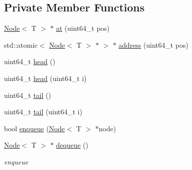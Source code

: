 \subsection*{Private Member Functions}
\begin{DoxyCompactItemize}
\item 
\hyperlink{classtervel_1_1containers_1_1lf_1_1mcas__buffer_1_1_node}{Node}$<$ T $>$ $\ast$ \hyperlink{classtervel_1_1containers_1_1lf_1_1mcas__buffer_1_1_ring_buffer_a5e063402e583e35b1a752fa9f0bc77ae}{at} (uint64\+\_\+t pos)
\item 
std\+::atomic$<$ \hyperlink{classtervel_1_1containers_1_1lf_1_1mcas__buffer_1_1_node}{Node}$<$ T $>$ $\ast$ $>$ $\ast$ \hyperlink{classtervel_1_1containers_1_1lf_1_1mcas__buffer_1_1_ring_buffer_a716654e9a9183d83f9f67b3d1e463c74}{address} (uint64\+\_\+t pos)
\item 
uint64\+\_\+t \hyperlink{classtervel_1_1containers_1_1lf_1_1mcas__buffer_1_1_ring_buffer_ad764c760dbb6e8dd202700be4625ae51}{head} ()
\item 
uint64\+\_\+t \hyperlink{classtervel_1_1containers_1_1lf_1_1mcas__buffer_1_1_ring_buffer_abdc4d1895aca3676cad7f74e033094b8}{head} (uint64\+\_\+t i)
\item 
uint64\+\_\+t \hyperlink{classtervel_1_1containers_1_1lf_1_1mcas__buffer_1_1_ring_buffer_a2f848529e514a53b53c0230ae99f5ae9}{tail} ()
\item 
uint64\+\_\+t \hyperlink{classtervel_1_1containers_1_1lf_1_1mcas__buffer_1_1_ring_buffer_a8e4241d911e10ec6a8e9c70afd9609af}{tail} (uint64\+\_\+t i)
\item 
bool \hyperlink{classtervel_1_1containers_1_1lf_1_1mcas__buffer_1_1_ring_buffer_a774f00d369aa4ed7fad8097a219834a1}{enqueue} (\hyperlink{classtervel_1_1containers_1_1lf_1_1mcas__buffer_1_1_node}{Node}$<$ T $>$ $\ast$node)
\item 
\hyperlink{classtervel_1_1containers_1_1lf_1_1mcas__buffer_1_1_node}{Node}$<$ T $>$ $\ast$ \hyperlink{classtervel_1_1containers_1_1lf_1_1mcas__buffer_1_1_ring_buffer_a996ceff99657741735d2b6e21c062d88}{dequeue} ()
\begin{DoxyCompactList}\small\item\em enqueue \end{DoxyCompactList}\end{DoxyCompactItemize}
